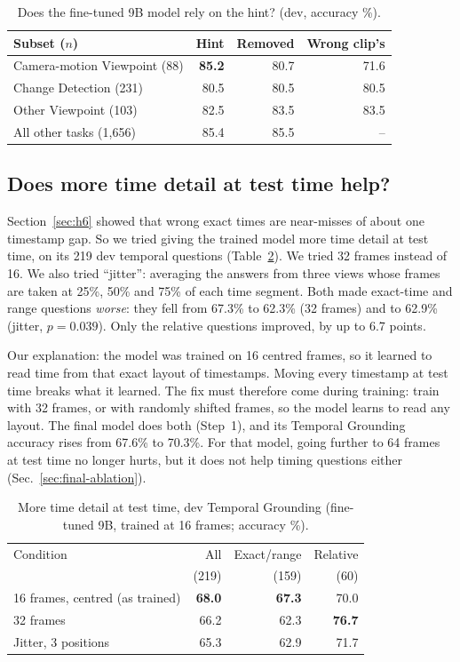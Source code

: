\begin{table}[t]
\centering
\caption{Does the fine-tuned 9B model rely on the hint? (dev, accuracy \%).}
\label{tab:reliance}
\footnotesize
\begin{tabular}{@{}lrrr@{}}
\toprule
Subset ($n$) & Hint & Removed & Wrong clip's \\
\midrule
Camera-motion Viewpoint (88) & \textbf{85.2} & 80.7 & 71.6 \\
Change Detection (231) & 80.5 & 80.5 & 80.5 \\
Other Viewpoint (103) & 82.5 & 83.5 & 83.5 \\
All other tasks (1,656) & 85.4 & 85.5 & -- \\
\bottomrule
\end{tabular}
\end{table}


\subsection{Does more time detail at test time help?}
\label{sec:timetest}
Section~\ref{sec:h6} showed that wrong exact times are near-misses of
about one timestamp gap. So we tried giving the trained model more time
detail at test time, on its
219 dev temporal questions (Table~\ref{tab:h6}). We tried 32 frames instead
of 16. We also tried ``jitter'': averaging the answers from three views
whose frames are taken at 25\%, 50\% and 75\% of each time segment. Both
made exact-time and range questions \emph{worse}: they fell from 67.3\% to
62.3\% (32 frames) and to 62.9\% (jitter, $p{=}0.039$). Only the relative
questions improved, by up to 6.7 points.

Our explanation: the model was trained on 16 centred frames, so it learned
to read time from that exact layout of timestamps. Moving every timestamp
at test time breaks what it learned. The fix must therefore come during
training: train with 32 frames, or with randomly shifted frames, so the
model learns to read any layout. The final model does both (Step~1), and
its Temporal Grounding accuracy rises from 67.6\% to 70.3\%. For that
model, going further to 64 frames at test time no longer hurts, but it
does not help timing questions either (Sec.~\ref{sec:final-ablation}).

\begin{table}[t]
\centering
\caption{More time detail at test time, dev Temporal Grounding
(fine-tuned 9B, trained at 16 frames; accuracy \%).}
\label{tab:h6}
\footnotesize
\begin{tabular}{@{}lrrr@{}}
\toprule
Condition & All & Exact/range & Relative \\
 & (219) & (159) & (60) \\
\midrule
16 frames, centred (as trained) & \textbf{68.0} & \textbf{67.3} & 70.0 \\
32 frames & 66.2 & 62.3 & \textbf{76.7} \\
Jitter, 3 positions & 65.3 & 62.9 & 71.7 \\
\bottomrule
\end{tabular}
\end{table}


